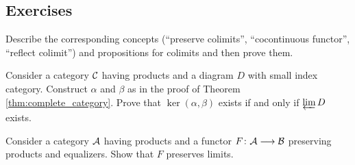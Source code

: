 \subsection{Exercises}
  \begin{ex}
    Describe the corresponding concepts (``preserve colimits'', ``cocontinuous functor'', ``reflect colimit'') and propositions for colimits and then prove them.
  \end{ex}
  \begin{ex}
    Consider a category ${\cal C}$ having products and a diagram $D$ with small index category. Construct $\alpha$ and $\beta$ as in the proof of Theorem \ref{thm:complete_category}. Prove that $\ker(\alpha,\beta)$ exists if and only if $\operatorname*{\underleftarrow{\lim}} D$ exists.
  \end{ex}
  \begin{ex}
    Consider a category ${\cal A}$ having products and a functor $F\colon{\cal A}\longrightarrow{\cal B}$ preserving products and equalizers. Show that $F$ preserves limits.
  \end{ex}


